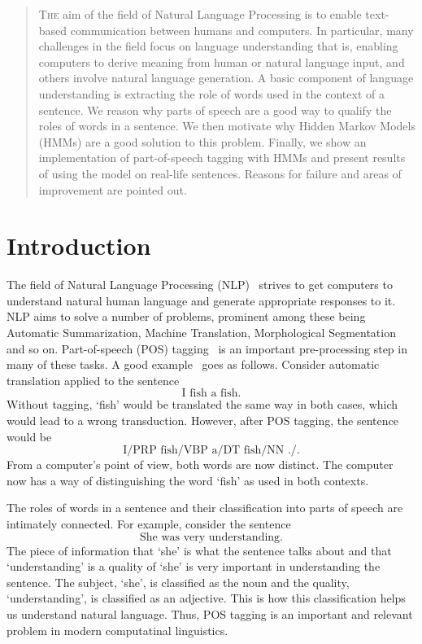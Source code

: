 \documentclass[11pt]{article}
\begin{document}
\maketitle

\begin{abstract}
\lettrine[lines=2]{T}{he} aim of the field of Natural Language Processing is to enable text-based communication between humans and computers. In particular, many challenges in the field focus on language understanding that is, enabling computers to derive meaning from human or natural language input, and others involve natural language generation. A basic component of language understanding is extracting the role of words used in the context of a sentence. We reason why parts of speech are a good way to qualify the roles of words in a sentence. We then motivate why Hidden Markov Models (HMMs) are a good solution to this problem. Finally, we show an implementation of part-of-speech tagging with HMMs and present results of using the model on real-life sentences. Reasons for failure and areas of improvement are pointed out.
\end{abstract}

\section{Introduction}
The field of Natural Language Processing (NLP)~\cite{wiki:nlp} strives to get computers to understand natural human language and generate appropriate responses to it. NLP aims to solve a number of problems, prominent among these being Automatic Summarization, Machine Translation, Morphological Segmentation and so on. Part-of-speech (POS) tagging~\cite{wiki:pos} is an important pre-processing step in many of these tasks. A good example~\cite{so:uses} goes as follows. Consider automatic translation applied to the sentence
%
$$\text{I fish a fish.}$$
%
Without tagging, `fish' would be translated the same way in both cases, which would lead to a wrong transduction. However, after POS tagging, the sentence would be
%
$$\text{I/PRP fish/VBP a/DT fish/NN ./.}$$
%
From a computer's point of view, both words are now distinct. The computer now has a way of distinguishing the word `fish' as used in both contexts.

The roles of words in a sentence and their classification into parts of speech are intimately connected. For example, consider the sentence
%
$$\text{She was very understanding.}$$
%
The piece of information that `she' is what the sentence talks about and that `understanding' is a quality of `she' is very important in understanding the sentence. The subject, `she', is classified as the noun and the quality, `understanding', is classified as an adjective. This is how this classification helps us understand natural language. Thus, POS tagging is an important and relevant problem in modern computatinal linguistics.
\end{document}
